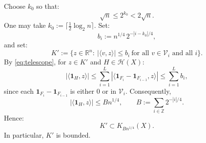 \documentclass[12pt,reqno]{amsart}
\makeatletter
\renewenvironment{proof}[1][\proofname]{%
  \par\vspace{\topsep}%
  \normalfont\topsep6\p@\@plus6\p@\relax
  \trivlist
  \item[\hskip\labelsep\itshape #1\@addpunct{.}]\ignorespaces
}{%
  \endtrivlist
}
\numberwithin{equation}{section}
\newcommand{\one}{\mathbf{1}}
\def \R {\mathbb{R}}
\makeatother
\begin{document}
\begin{proof}
Choose \(k_0\) so that:
\[
\sqrt n\le2^{k_0}<2\sqrt n.
\]
One may take \(k_0:=\lceil\frac12\log_2n\rceil\). Set:
\[
b_i:=n^{1/4}\,2^{-|i-k_0|/4},
\]
and set:
\[
K':=\bigl\{z\in\R^n:\ |\langle v,z\rangle|\le b_i\ \text{for all }v\in\mathcal V_i\text{ and all }i\bigr\}.
\]
By \eqref{eq:telescope}, for \(z\in K'\) and \(H\in\mathcal H(X)\):
\[
|\langle\one_H,z\rangle| \le 
\sum_{i=1}^L
|\langle\one_{F_i}-\one_{F_{i-1}},z\rangle| \le\sum_{i=1}^Lb_i,
\]
since each \(\one_{F_i}-\one_{F_{i-1}}\) is either 0 or in \(\mathcal V_i\). Consequently,
\[
|\langle\one_H,z\rangle| \le Bn^{1/4},\qquad
B:=\sum_{i\in\mathbb Z}2^{-|i|/4}.
\]
Hence:
\begin{equation}\label{eq:chain-support}
K'\subset K_{Bn^{1/4}}(X).
\end{equation}
In particular, \(K'\) is bounded.
\smallskip%


\end{proof}
\end{document}
